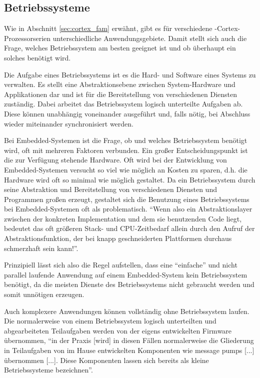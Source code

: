 	\subsection{Betriebssysteme}
	\label{sec:os}
	Wie in Abschnitt \ref{sec:cortex_fam} erwähnt, gibt es für verschiedene -Cortex-Prozessorserien unterschiedliche
	Anwendungsgebiete. Damit stellt sich auch die Frage, welches Betriebssystem am besten geeignet ist und ob
	überhaupt ein solches benötigt wird.

	Die Aufgabe eines Betriebssystems ist es die Hard- und Software eines Systems zu verwalten. Es stellt eine
	Abstraktionsebene zwischen System-Hardware und Applikationen dar und ist für die Bereitstellung von verschiedenen
	Diensten zuständig. Dabei arbeitet das Betriebssystem logisch unterteilte Aufgaben ab. Diese können unabhängig
	voneinander ausgeführt und, falls nötig, bei Abschluss wieder miteinander synchronisiert werden.

	Bei Embedded-Systemen ist die Frage, ob und welches Betriebssystem benötigt wird, oft mit mehreren Faktoren
	verbunden. Ein großer Entscheidungspunkt ist die zur Verfügung stehende Hardware. Oft wird bei der Entwicklung
	von Embedded-Systemen versucht so viel wie möglich an Kosten zu sparen, d.h. die Hardware wird oft so minimal wie
	möglich gestaltet. Da ein Betriebssystem durch seine Abstraktion und Bereitstellung von verschiedenen Diensten und
	Programmen großen  erzeugt, gestaltet sich die Benutzung eines Betriebssystems bei
	Embedded-Systemen oft als problematisch.
	``Wenn also ein Abstraktionslayer zwischen der konkreten Implementation und dem sie benutzenden Code liegt, bedeutet
	das oft größeren Stack- und CPU-Zeitbedarf allein durch den Aufruf der Abstraktionsfunktion, der bei knapp
	geschneiderten Plattformen durchaus schmerzhaft sein kann!''\citep[Kap.~2.2]{Asche2017}.

	Prinzipiell lässt sich also die Regel aufstellen, dass eine ``einfache'' und nicht parallel laufende Anwendung auf
	einem Embedded-System kein Betriebssystem benötigt, da die meisten Dienste des Betriebssystems nicht gebraucht werden
	und somit unnötigen  erzeugen.

	Auch komplexere Anwendungen können vollständig ohne Betriebssystem laufen. Die normalerweise von einem
	Betriebssystem logisch unterteilten und abgearbeiteten Teilaufgaben werden von der eigens entwickelten Firmware
	übernommen,
	``in der Praxis [wird] in diesen Fällen normalerweise die Gliederung in Teilaufgaben von im Hause entwickelten
	Komponenten wie message pumps [...] übernommen [...]. Diese Komponenten lassen sich bereits als kleine
	Betriebssysteme bezeichnen''\citep[Kap.~3.2]{Asche2017}.

